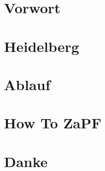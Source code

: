 \documentclass[ngerman,a5paper]{scrbook}
\begin{document}
\chapter{Vorwort}


\setcounter{tocdepth}{1} %
\tableofcontents



\chapter{Heidelberg}







\chapter{Ablauf}



\chapter{How To ZaPF}



\chapter{Danke}



\end{document}
